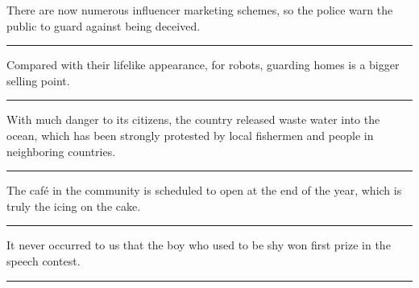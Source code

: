 \documentclass[11pt,a4paper]{article}
\newcommand{\num}[1]{\makebox[1.9em][r]{#1.}\hspace{0.3em}}
\newcommand{\wline}{\noindent\rule{\linewidth}{0.4pt}}
\begin{document}
\begin{minipage}{\linewidth}

\num{34}There are now numerous influencer marketing schemes, so the police warn the public to guard against being deceived.

\vspace{0.25em}

\wline

\end{minipage}

\begin{minipage}{\linewidth}

\num{35}Compared with their lifelike appearance, for robots, guarding homes is a bigger selling point.

\vspace{0.25em}

\wline

\end{minipage}

\begin{minipage}{\linewidth}

\num{36}With much danger to its citizens, the country released waste water into the ocean, which has been strongly protested by local fishermen and people in neighboring countries.

\vspace{0.25em}

\wline

\end{minipage}

\vspace{0.35em}\vspace{0.15em}

\begin{minipage}{\linewidth}

\num{37}The café in the community is scheduled to open at the end of the year, which is truly the icing on the cake.

\vspace{0.25em}

\wline

\end{minipage}

\begin{minipage}{\linewidth}

\num{38}It never occurred to us that the boy who used to be shy won first prize in the speech contest.

\vspace{0.25em}

\wline

\end{minipage}
\end{document}
